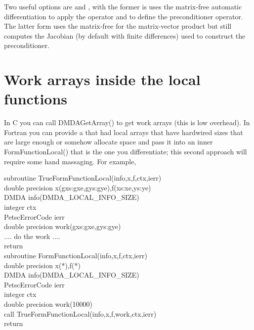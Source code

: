 Two useful options are  and ,
with the former is uses the matrix-free automatic differentiation to apply the operator
and to define the preconditioner operator. The latter form uses the matrix-free for the 
matrix-vector product but still computes the Jacobian (by default with finite differences)
used to construct the preconditioner.

\section{Work arrays inside the local functions} In C you can call DMDAGetArray() to get 
work arrays (this is low overhead). In Fortran you can provide a 
that had local arrays that have hardwired sizes that are large enough or somehow allocate
space and pass it into an inner FormFunctionLocal() that is the one you differentiate; this
second approach will require some hand massaging. For example,

\begin{tabbing}
  subroutine TrueFormFunctionLocal(info,x,f,ctx,ierr)\\
  double precision x(gxs:gxe,gys:gye),f(xs:xe,ys:ye)\\
  DMDA info(DMDA\_LOCAL\_INFO\_SIZE)\\
  integer ctx\\
  PetscErrorCode ierr\\
  double precision work(gxs:gxe,gys:gye)\\
   
  .... do the work ....\\


  return\\
   
  subroutine FormFunctionLocal(info,x,f,ctx,ierr)\\

  double precision x(*),f(*)\\
  DMDA info(DMDA\_LOCAL\_INFO\_SIZE)\\
  PetscErrorCode ierr\\
  integer ctx\\
  double precision work(10000)\\

  call TrueFormFunctionLocal(info,x,f,work,ctx,ierr)\\
  return
\end{tabbing}

\cleardoublepage
